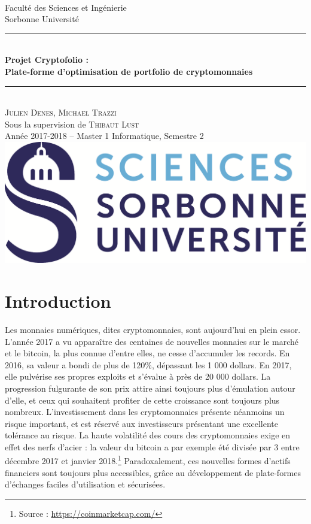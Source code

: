 \documentclass[a4paper, 10pt]{article}
\newcommand{\HRule}{\rule{\linewidth}{0.5mm}}
\begin{document}
\begin{titlepage}
\begin{center}
~\\[1cm]
\Large Faculté des Sciences et Ingénierie\\Sorbonne Université\\[3.5cm]
\HRule 
\\[0.4cm]{\huge \bfseries Projet Cryptofolio :\\[0.1cm] Plate-forme d’optimisation de portfolio de cryptomonnaies\\[0.4cm]}
\HRule \\[1cm] 
\Large \textsc{Julien Denes, Michaël Trazzi} \\[0.1cm]
\Large Sous la supervision de \textsc{Thibaut Lust}\\[2cm]
\Large Année 2017-2018 -- Master 1 Informatique, Semestre 2 \\[4cm]
\includegraphics[scale=0.3]{logo.png}
\end{center}
\end{titlepage}

\tableofcontents

\newpage
\section*{Introduction}
\label{sec:intro}

Les monnaies numériques, dites cryptomonnaies, sont aujourd'hui en plein essor. L'année 2017 a vu apparaître des centaines de nouvelles monnaies sur le marché et le bitcoin, la plus connue d'entre elles, ne cesse d’accumuler les records. En 2016, sa valeur a bondi de plus de 120\%, dépassant les 1 000 dollars. En 2017, elle pulvérise ses propres exploits et s'évalue à près de 20 000 dollars. La progression fulgurante de son prix attire ainsi toujours plus d'émulation autour d'elle, et ceux qui souhaitent profiter de cette croissance sont toujours plus nombreux. L’investissement dans les cryptomonnaies présente néanmoins un risque important, et est réservé aux investisseurs présentant une excellente tolérance au risque. La haute volatilité des cours des cryptomonnaies exige en effet des nerfs d’acier : la valeur du bitcoin a par exemple été divisée par 3 entre décembre 2017 et janvier 2018.\footnote{Source : \url{https://coinmarketcap.com/}} Paradoxalement, ces nouvelles formes d'actifs financiers sont toujours plus accessibles, grâce au développement de plate-formes d'échanges faciles d'utilisation et sécurisées.
\end{document}
